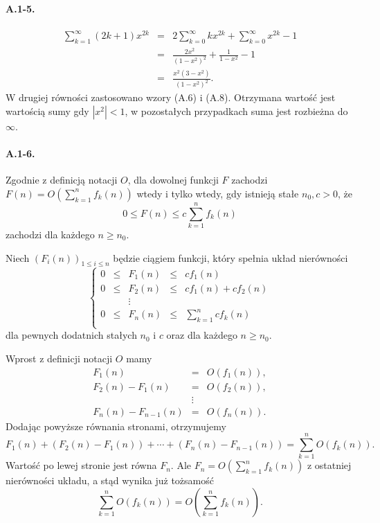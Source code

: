 \paragraph{A.1-5.}
\begin{eqnarray*}
	\sum_{k=1}^\infty(2k+1)x^{2k} &=& 2\sum_{k=0}^\infty kx^{2k}+\sum_{k=0}^\infty x^{2k}-1 \\
	&=& \frac{2x^2}{(1-x^2)^2}+\frac{1}{1-x^2}-1 \\
	&=& \frac{x^2(3-x^2)}{(1-x^2)^2}.
\end{eqnarray*}
W drugiej równości zastosowano wzory (A.6) i (A.8). Otrzymana wartość jest wartością sumy gdy $|x^2|<1$, w pozostałych przypadkach suma jest rozbieżna do $\infty$.

\paragraph{A.1-6.}
Zgodnie z definicją notacji $O$, dla dowolnej funkcji $F$ zachodzi $F(n) = O\left(\sum_{k=1}^nf_k(n)\right)$ wtedy i tylko wtedy, gdy istnieją stałe $n_0,c>0$, że
\[
0\le F(n)\le c\sum_{k=1}^n f_k(n)
\]
zachodzi dla każdego $n\ge n_0$.

Niech $(F_i(n))_{1\le i\le n}$ będzie ciągiem funkcji, który spełnia układ nierówności
\[
	\left\{ \begin{array}{ccccl}
		0 & \le & F_1(n) & \le & cf_1(n) \\
		0 & \le & F_2(n) & \le & cf_1(n) + cf_2(n) \\
		& & \vdots \\
		0 & \le & F_n(n) & \le & \sum_{k=1}^ncf_k(n) \\
	\end{array}
	\right.
\]
dla pewnych dodatnich stałych $n_0$ i $c$ oraz dla każdego $n\ge n_0$.

\bigskip
\noindent Wprost z definicji notacji $O$ mamy
\begin{eqnarray*}
	F_1(n) & = & O(f_1(n)),\\
	F_2(n) - F_1(n) & = & O(f_2(n)),\\
	& \vdots \\
	F_n(n) - F_{n-1}(n) & = & O(f_n(n)).
\end{eqnarray*}
Dodając powyższe równania stronami, otrzymujemy
\[
	F_1(n)+(F_2(n)-F_1(n))+\cdots+(F_n(n)-F_{n-1}(n))=\sum_{k=1}^nO\left(f_k(n)\right).
\]
Wartość po lewej stronie jest równa $F_n$. Ale $F_n = O\left(\sum_{k=1}^nf_k(n)\right)$ z ostatniej nierówności układu, a stąd wynika już tożsamość
\[
	\sum_{k=1}^nO\left(f_k(n)\right) = O\left(\sum_{k=1}^nf_k(n)\right).
\]

